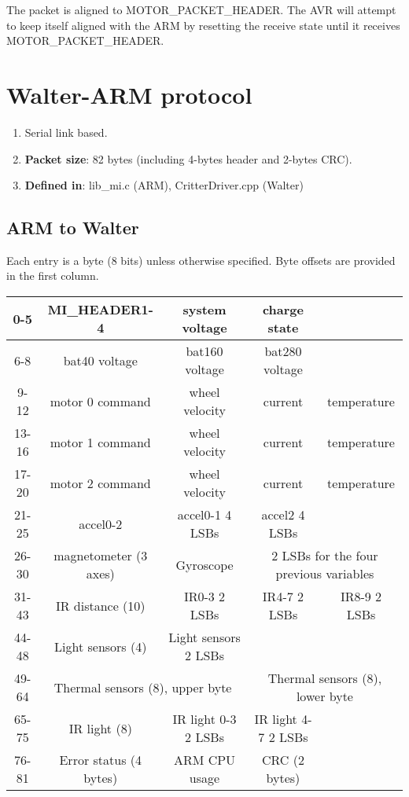 \documentclass[12pt]{article}
\newcommand{\kw}[1]{\textbf{#1}}
\begin{document}
The packet is aligned to MOTOR\_PACKET\_HEADER. The AVR will attempt to keep itself aligned with
the ARM by resetting the receive state until it receives MOTOR\_PACKET\_HEADER.


\section{Walter-ARM protocol}

\begin{enumerate}
  \item{Serial link based.}
  \item{\kw{Packet size}: 82 bytes (including 4-bytes header and 2-bytes CRC).} 
  \item{\kw{Defined in}: lib\_mi.c (ARM), CritterDriver.cpp (Walter)}
\end{enumerate}

\subsection{ARM to Walter}

Each entry is a byte (8 bits) unless otherwise specified. Byte offsets are provided in the first 
column. 

\begin{center}
\begin{tabular}{|c||c|c|c|c|}
\hline
0-5 & MI\_HEADER1-4 & system voltage & charge state & \\
\hline
6-8 & bat40 voltage & bat160 voltage & bat280 voltage & \\
\hline
\hline
9-12 & motor 0 command & wheel velocity & current & temperature \\
13-16 & motor 1 command & wheel velocity & current & temperature \\
17-20 & motor 2 command & wheel velocity & current & temperature \\
\hline
\hline
21-25 & accel0-2 & accel0-1 4 LSBs & accel2 4 LSBs & \\
\hline
26-30 & magnetometer (3 axes) & Gyroscope & \multicolumn{2}{c|}{2 LSBs for the four previous variables} \\
\hline
31-43 & IR distance (10) & IR0-3 2 LSBs & IR4-7 2 LSBs & IR8-9 2 LSBs \\
\hline
44-48 & Light sensors (4) & Light sensors 2 LSBs & & \\
\hline
49-64 & \multicolumn{2}{c|}{Thermal sensors (8), upper byte} & \multicolumn{2}{c|}{Thermal sensors (8), lower byte} \\
\hline
65-75 & IR light (8) & IR light 0-3 2 LSBs & IR light 4-7 2 LSBs & \\
\hline
76-81 & Error status (4 bytes) & ARM CPU usage & CRC (2 bytes) & \\ 
\hline
\end{tabular}
\end{center}
\end{document}
